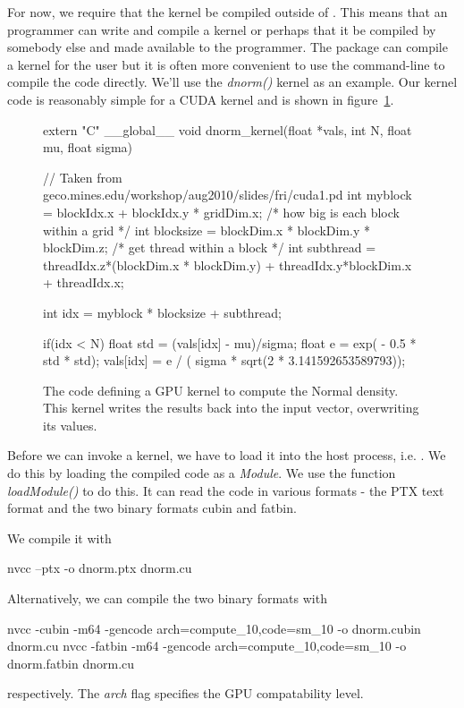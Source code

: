 \documentclass[article]{jss}
\def\C{\proglang{C}}
\def\R{\proglang{R}}
\def\Rpkg#1{\pkg{#1}}
\def\Rfunc#1{\textsl{#1()}}
\def\Cfunc#1{\textit{#1()}}
\def\ShFlag#1{\textit{#1}}
\begin{document}
For now, we require that the kernel be compiled outside of \R.  This
means that an \R{} programmer can write and compile a kernel or
perhaps that it be compiled by somebody else and made available to the
\R{} programmer.  The \Rpkg{RCUDA} package can compile a kernel for
the \R{} user but it is often more convenient to use the command-line
to compile the code directly. 
We'll use the \Cfunc{dnorm} kernel as an example.
Our kernel code is reasonably simple for a CUDA kernel and is shown in
figure~\ref{fig:dnormKernelCode}.
\begin{figure}
\begin{CCode}
extern "C"
__global__ void dnorm_kernel(float *vals, int N, float mu, float sigma)
{
       // Taken from geco.mines.edu/workshop/aug2010/slides/fri/cuda1.pd
    int myblock = blockIdx.x + blockIdx.y * gridDim.x;
           /* how big is each block within a grid */
    int blocksize = blockDim.x * blockDim.y * blockDim.z;
            /* get thread within a block */
    int subthread = threadIdx.z*(blockDim.x * blockDim.y) + 
                         threadIdx.y*blockDim.x + threadIdx.x;

    int idx = myblock * blocksize + subthread;

	if(idx < N) {
            float std = (vals[idx] - mu)/sigma;
	    float e = exp( - 0.5 * std * std);
	    vals[idx] = e / ( sigma * sqrt(2 * 3.141592653589793));
	}
}
\end{CCode}
\caption{The \C{} code defining a GPU kernel to compute the Normal
  density.  This kernel writes the results back into the input
  vector, overwriting its values.
}\label{fig:dnormKernelCode}
\end{figure}

Before we can invoke a kernel, we have to load it into the host
process, i.e. \R.  We do this by loading the compiled code as a
\textit{Module}.  We use the \R{} function \Rfunc{loadModule} to do
this. It can read the code in various formats - the PTX text format
and the two binary formats cubin and fatbin.

We compile it with 
\begin{ShCode}
nvcc --ptx -o dnorm.ptx dnorm.cu
\end{ShCode}
Alternatively, we can compile the two binary formats with 
\begin{ShCode}
nvcc -cubin -m64 -gencode arch=compute_10,code=sm_10 -o dnorm.cubin dnorm.cu
nvcc -fatbin -m64 -gencode arch=compute_10,code=sm_10 -o dnorm.fatbin dnorm.cu
\end{ShCode}
respectively.
The \ShFlag{arch} flag specifies the GPU compatability level.%
\end{document}
